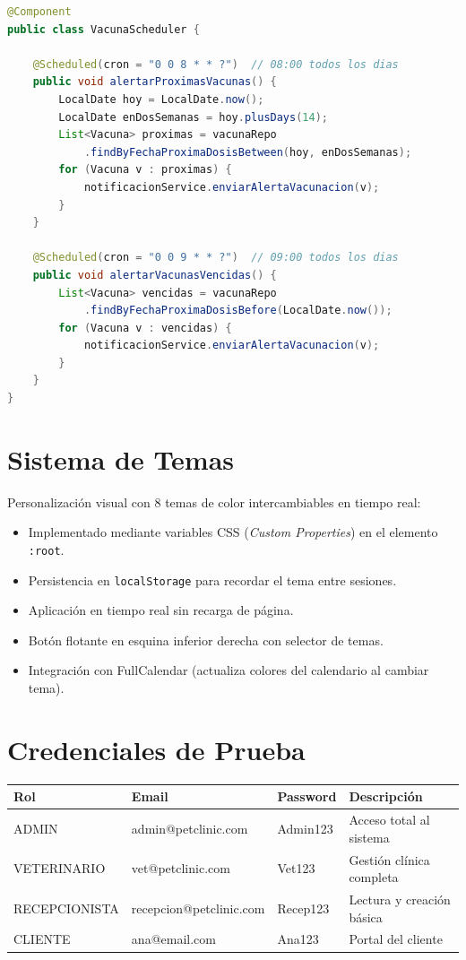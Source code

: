 \begin{lstlisting}[language=Java, caption=Programaci\'on de alertas de vacunaci\'on]
@Component
public class VacunaScheduler {

    @Scheduled(cron = "0 0 8 * * ?")  // 08:00 todos los dias
    public void alertarProximasVacunas() {
        LocalDate hoy = LocalDate.now();
        LocalDate enDosSemanas = hoy.plusDays(14);
        List<Vacuna> proximas = vacunaRepo
            .findByFechaProximaDosisBetween(hoy, enDosSemanas);
        for (Vacuna v : proximas) {
            notificacionService.enviarAlertaVacunacion(v);
        }
    }

    @Scheduled(cron = "0 0 9 * * ?")  // 09:00 todos los dias
    public void alertarVacunasVencidas() {
        List<Vacuna> vencidas = vacunaRepo
            .findByFechaProximaDosisBefore(LocalDate.now());
        for (Vacuna v : vencidas) {
            notificacionService.enviarAlertaVacunacion(v);
        }
    }
}
\end{lstlisting}

\section{Sistema de Temas}

Personalizaci\'on visual con 8 temas de color intercambiables en tiempo real:

\begin{itemize}
    \item Implementado mediante variables CSS (\textit{Custom Properties}) en el elemento \texttt{:root}.
    \item Persistencia en \texttt{localStorage} para recordar el tema entre sesiones.
    \item Aplicaci\'on en tiempo real sin recarga de p\'agina.
    \item Bot\'on flotante en esquina inferior derecha con selector de temas.
    \item Integraci\'on con FullCalendar (actualiza colores del calendario al cambiar tema).
\end{itemize}

\section{Credenciales de Prueba}

\begin{longtable}{|p{3cm}|p{4cm}|p{3cm}|p{4cm}|}
\hline
\textbf{Rol} & \textbf{Email} & \textbf{Password} & \textbf{Descripci\'on} \\
\hline
ADMIN & admin@petclinic.com & Admin123 & Acceso total al sistema \\
VETERINARIO & vet@petclinic.com & Vet123 & Gesti\'on cl\'inica completa \\
RECEPCIONISTA & recepcion@petclinic.com & Recep123 & Lectura y creaci\'on b\'asica \\
CLIENTE & ana@email.com & Ana123 & Portal del cliente \\
\hline
\end{longtable}
